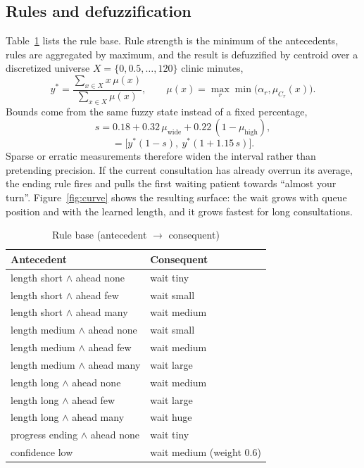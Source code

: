 \documentclass[conference]{IEEEtran}
\begin{document}
\subsection{Rules and defuzzification}
Table~\ref{tab:rules} lists the rule base. Rule strength is the minimum of the
antecedents, rules are aggregated by maximum, and the result is defuzzified by
centroid over a discretized universe $X=\{0,0.5,\dots,120\}$ clinic minutes,
\begin{equation}
y^{*} = \frac{\sum_{x\in X} x\,\mu(x)}{\sum_{x\in X}\mu(x)},
\qquad
\mu(x)=\max_{r}\min\!\big(\alpha_r,\mu_{C_r}(x)\big).
\end{equation}
Bounds come from the same fuzzy state instead of a fixed percentage,
\begin{equation}
s = 0.18 + 0.32\,\mu_{\mathrm{wide}} + 0.22\,(1-\mu_{\mathrm{high}}),
\end{equation}
\begin{equation}
[y^{-},y^{+}] = \big[y^{*}(1-s),\ y^{*}(1+1.15\,s)\big].
\end{equation}
Sparse or erratic measurements therefore widen the interval rather than
pretending precision. If the current consultation has already overrun its
average, the ending rule fires and pulls the first waiting patient towards
``almost your turn''. Figure~\ref{fig:curve} shows the resulting surface: the
wait grows with queue position and with the learned length, and it grows fastest
for long consultations.

\begin{table}[t]
\caption{Rule base (antecedent $\rightarrow$ consequent)}
\label{tab:rules}
\centering
\small
\begin{tabular}{@{}ll@{}}
\toprule
Antecedent & Consequent \\
\midrule
length short $\wedge$ ahead none & wait tiny \\
length short $\wedge$ ahead few & wait small \\
length short $\wedge$ ahead many & wait medium \\
length medium $\wedge$ ahead none & wait small \\
length medium $\wedge$ ahead few & wait medium \\
length medium $\wedge$ ahead many & wait large \\
length long $\wedge$ ahead none & wait medium \\
length long $\wedge$ ahead few & wait large \\
length long $\wedge$ ahead many & wait huge \\
progress ending $\wedge$ ahead none & wait tiny \\
confidence low & wait medium (weight 0.6) \\
\bottomrule
\end{tabular}
\end{table}
\end{document}
